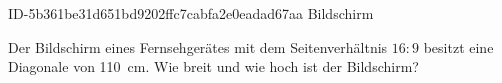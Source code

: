 \begin{exercise}
      {ID-5b361be31d651bd9202ffc7cabfa2e0eadad67aa}
      {Bildschirm}
  \ifproblem\problem\par
    Der Bildschirm eines Fernsehgerätes mit dem
    Seitenverhältnis $16:9$ besitzt eine
    Diagonale von \SI{110}{\centi\metre}.
    Wie breit und wie hoch ist der Bildschirm?
  \fi
\end{exercise}
